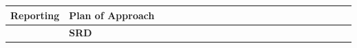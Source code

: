 \begin{table}[ht!]
\begin{tabular}{lp{2.5in}|llllllllllllllllllll|}
    \multicolumn{1}{|l|}{\cellcolor[HTML]{00E2FF}\textbf{Reporting}}       & \cellcolor[HTML]{00E2FF}\textbf{Plan of Approach}                          & \multicolumn{1}{l|}{\cellcolor[HTML]{F8A102}}           & \multicolumn{1}{l|}{\cellcolor[HTML]{F8A102}}           & \multicolumn{1}{l|}{}                                   & \multicolumn{1}{l|}{}                                   & \multicolumn{1}{l|}{}                                   & \multicolumn{1}{l|}{}                                   & \multicolumn{1}{l|}{}                                   & \multicolumn{1}{l|}{}                                   & \multicolumn{1}{l|}{}                                   & \multicolumn{1}{l|}{}                                    & \multicolumn{1}{l|}{}                                    & \multicolumn{1}{l|}{}                                    & \multicolumn{1}{l|}{}                                    & \multicolumn{1}{l|}{}                                    & \multicolumn{1}{l|}{}                                    & \multicolumn{1}{l|}{}                                    & \multicolumn{1}{l|}{}                                    & \multicolumn{1}{l|}{}                                    & \multicolumn{1}{l|}{}                                    &             \\ \hline
    \multicolumn{1}{|l|}{\cellcolor[HTML]{00E2FF}\textbf{}}                & \cellcolor[HTML]{00E2FF}\textbf{SRD}                                       & \multicolumn{1}{l|}{}                                   & \multicolumn{1}{l|}{}                                   & \multicolumn{1}{l|}{\cellcolor[HTML]{F8A102}}           & \multicolumn{1}{l|}{}                                   & \multicolumn{1}{l|}{}                                   & \multicolumn{1}{l|}{}                                   & \multicolumn{1}{l|}{}                                   & \multicolumn{1}{l|}{}                                   & \multicolumn{1}{l|}{}                                   & \multicolumn{1}{l|}{}                                    & \multicolumn{1}{l|}{}                                    & \multicolumn{1}{l|}{}                                    & \multicolumn{1}{l|}{}                                    & \multicolumn{1}{l|}{}                                    & \multicolumn{1}{l|}{}                                    & \multicolumn{1}{l|}{}                                    & \multicolumn{1}{l|}{}                                    & \multicolumn{1}{l|}{}                                    & \multicolumn{1}{l|}{}                                    &             \\ \hline

\end{tabular}
\end{table}
